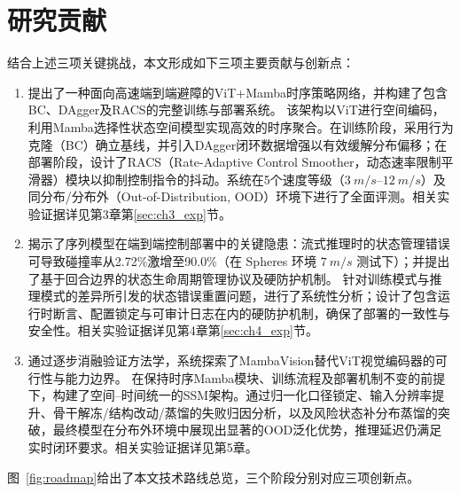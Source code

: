 \section{研究贡献}

结合上述三项关键挑战，本文形成如下三项主要贡献与创新点：

\begin{enumerate}

  \item 提出了一种面向高速端到端避障的ViT+Mamba时序策略网络，并构建了包含BC、DAgger及RACS的完整训练与部署系统。
  该架构以ViT进行空间编码，利用Mamba选择性状态空间模型实现高效的时序聚合。在训练阶段，采用行为克隆（BC）确立基线，并引入DAgger闭环数据增强以有效缓解分布偏移；在部署阶段，设计了RACS（Rate-Adaptive Control Smoother，动态速率限制平滑器）模块以抑制控制指令的抖动。系统在5个速度等级（$\SI{3}{m/s}$--$\SI{12}{m/s}$）及同分布/分布外（Out-of-Distribution, OOD）环境下进行了全面评测。相关实验证据详见第3章第\ref{sec:ch3_exp}节。

  \item 揭示了序列模型在端到端控制部署中的关键隐患：流式推理时的状态管理错误可导致碰撞率从2.72\%激增至90.0\%（在 Spheres 环境 $\SI{7}{m/s}$ 测试下）；并提出了基于回合边界的状态生命周期管理协议及硬防护机制。
  针对训练模式与推理模式的差异所引发的状态错误重置问题，进行了系统性分析；设计了包含运行时断言、配置锁定与可审计日志在内的硬防护机制，确保了部署的一致性与安全性。相关实验证据详见第4章第\ref{sec:ch4_exp}节。

  \item 通过逐步消融验证方法学，系统探索了MambaVision替代ViT视觉编码器的可行性与能力边界。
  在保持时序Mamba模块、训练流程及部署机制不变的前提下，构建了空间--时间统一的SSM架构。通过归一化口径锁定、输入分辨率提升、骨干解冻/结构改动/蒸馏的失败归因分析，以及风险状态补分布蒸馏的突破，最终模型在分布外环境中展现出显著的OOD泛化优势，推理延迟仍满足实时闭环要求。相关实验证据详见第5章。

\end{enumerate}

图~\ref{fig:roadmap}给出了本文技术路线总览，三个阶段分别对应三项创新点。

